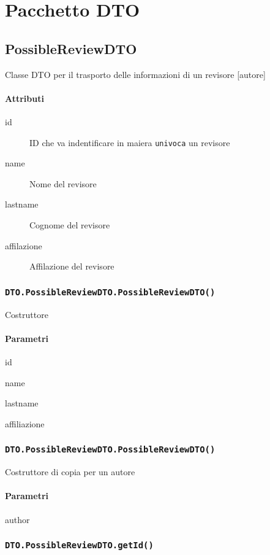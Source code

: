 \section{Pacchetto DTO}
\label{sec:package_dto}

\subsection{PossibleReviewDTO}
Classe DTO per il trasporto delle informazioni di un revisore [autore]
\paragraph{Attributi}
\begin{description}
\item [id] ID che va indentificare in maiera \texttt{univoca} un revisore
\item [name] Nome del revisore
\item [lastname] Cognome del revisore 
\item [affilazione] Affilazione del revisore
\end{description}
\subsubsection{\texttt{DTO.PossibleReviewDTO.PossibleReviewDTO()}}
Costruttore
\paragraph{Parametri}
\begin{description}
\item id
\item name
\item lastname
\item affiliazione
\end{description}
\subsubsection{\texttt{DTO.PossibleReviewDTO.PossibleReviewDTO()}}
Costruttore di copia per un autore
\paragraph{Parametri}
\begin{description}
\item author
\end{description}
\subsubsection{\texttt{DTO.PossibleReviewDTO.getId()}}
